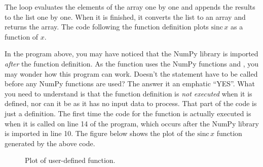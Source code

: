\documentclass[letterpaper,10pt,english]{sphinxmanual}
\begin{document}
The  loop evaluates the elements of the  array one by one and appends the results to the list  one by one.  When it is finished, it converts the list to an array and returns the array.  The code following the function definition plots $\mathrm{sinc}\,x$ as a function of $x$.

In the program above, you may have noticed that the NumPy library is imported \emph{after} the  function definition.  As the function uses the NumPy functions  and , you may wonder how this program can work.  Doesn't the  statement have to be called before any NumPy functions are used?  The answer it an emphatic ``YES''.  What you need to understand is that the function definition is \emph{not executed} when it is defined, nor can it be as it has no input  data to process.  That part of the code is just a definition.  The first time the code for the  function is actually executed is when it is called on line 14 of the program, which occurs after the NumPy library is imported in line 10.  The figure below shows the plot of the $\mathrm{sinc}\,x$ function generated by the above code.
\begin{figure}[htbp]
\centering
\capstart

\caption{Plot of user-defined  function.}\end{figure}

\end{document}
